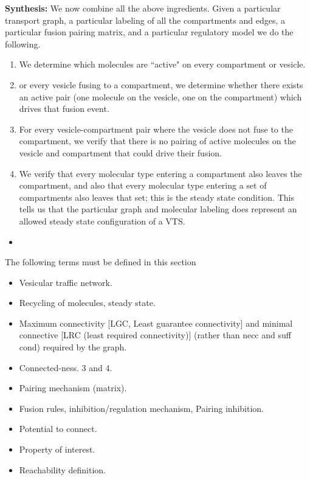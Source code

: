 \textbf{Synthesis:} We now combine all the above ingredients. Given a particular
transport graph, a particular labeling of all the compartments and edges,
a particular fusion pairing matrix, and a particular regulatory model we do
the following.
\begin{enumerate}
\item We determine which molecules are ``active" on every
compartment or vesicle.
\item or every vesicle fusing to a compartment, we
determine whether there exists an active pair (one molecule on the vesicle,
one on the compartment) which drives that fusion event.
\item For every vesicle-compartment pair where the vesicle does not fuse to the
compartment, we verify that there is no pairing of active molecules on the
vesicle and compartment that could drive their fusion.
\item We verify that every molecular type entering a compartment also leaves the compartment,
and also that every molecular type entering a set of compartments also
leaves that set; this is the steady state condition. This tells us that the
particular graph and molecular labeling does represent an allowed steady
state configuration of a VTS.
\end{enumerate}

\begin{itemize}
\item {}
\end{itemize}



The following terms must be defined in this section
\begin{itemize}
\item Vesicular traffic network.
\item Recycling of molecules, steady state.
\item Maximum connectivity [LGC, Least guarantee connectivity] and minimal connective [LRC (least required connectivity)] (rather than necc and suff cond) required by the graph. 
\item Connected-ness. 3 and 4.
\item Pairing mechanism (matrix).
\item Fusion rules, inhibition/regulation mechanism, Pairing inhibition.
\item Potential to connect.
\item Property of interest.
\item Reachability definition.
\end{itemize}




